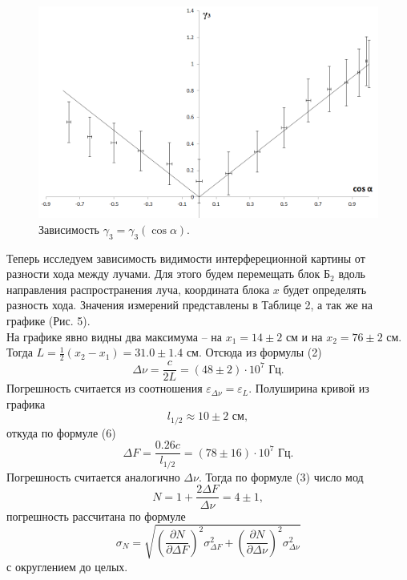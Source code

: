 \documentclass[a4paper,12pt]{article}
\begin{document}
\begin{figure}[h]
\includegraphics[scale=0.6]{4.png}
\centering
\caption{Зависимость $\gamma_3 = \gamma_3(\cos \alpha)$.}
\end{figure}
Теперь исследуем зависимость видимости интерфереционной картины от разности хода между лучами. Для этого будем перемещать блок $\text{Б}_2$ вдоль направления распространения луча, координата блока $x$ будет определять разность хода. Значения измерений представлены в Таблице 2, а так же на графике (Рис. 5).\\
На графике явно видны два максимума -- на $x_1 = 14\pm 2 \text{ см}$ и на $x_2 = 76 \pm 2 \text{ см}$. Тогда $L = \frac{1}{2}(x_2 - x_1) = 31.0 \pm 1.4 \text{ см}$. Отсюда из формулы (2)
$$
\Delta \nu = \dfrac{c}{2L} = (48 \pm 2) \cdot 10^7 \text{ Гц}.
$$
Погрешность считается из соотношения $\varepsilon_{\Delta\nu} = \varepsilon_{L}$. Полуширина кривой из графика
$$
l_{1/2} \approx 10 \pm 2 \text{ см},
$$
откуда по формуле (6)
$$
\Delta F = \dfrac{0.26 c}{l_{1/2}} = (78 \pm 16) \cdot 10^7 \text{ Гц}.
$$
Погрешность считается аналогично $\Delta \nu$. Тогда по формуле (3) число мод
$$
N = 1 + \dfrac{2\Delta F}{\Delta \nu} = 4 \pm 1,
$$
погрешность рассчитана по формуле
$$
\sigma_N = \sqrt{\left( \dfrac{\partial N}{\partial \Delta F} \right)^2 \sigma^2_{\Delta F} + \left( \dfrac{\partial N}{\partial \Delta \nu} \right)^2 \sigma^2_{\Delta \nu}}
$$
с округлением до целых.
\end{document}
